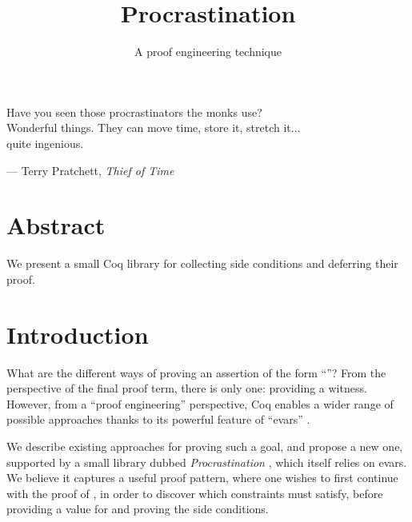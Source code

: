 \documentclass[xetex,format=acmlarge,screen=true,authorversion=true]{acmart-modified}
\begin{document}
\title{%
  Procrastination
}
\subtitle{%
  A proof engineering technique
}

\maketitle

\vspace{-1em}


\begin{flushright}
  {\sc Have you seen those procrastinators the monks use? \\
    Wonderful things. They can move time, store it, stretch it... \\
    quite ingenious. }

  \vspace{0.3em}

  --- Terry Pratchett, \emph{Thief of Time}
\end{flushright}

\vspace{1em}

\section*{Abstract}
We present a small Coq library for collecting side conditions and deferring
their proof.

\section{Introduction}

What are the different ways of proving an assertion of the form ``''? From the perspective of the final proof term, there is only one:
providing a witness. However, from a ``proof engineering'' perspective, Coq
enables a wider range of possible approaches thanks to its powerful feature of
``evars'' \cite[\S2.11]{coq}.

We describe existing approaches for proving such a goal, and propose a new one,
supported by a small library dubbed \emph{Procrastination}
\cite{procrastination}, which itself relies on evars. We believe it captures a
useful proof pattern, where one wishes to first continue with the proof of , in order to discover which constraints  must satisfy, before
providing a value for  and proving the side conditions.
\end{document}
